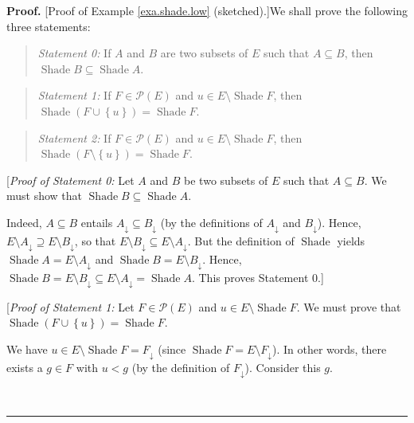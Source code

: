 \documentclass[numbers=enddot,12pt,final,onecolumn]{scrartcl}%
\theoremstyle{definition}
\newenvironment{statement}{\begin{quote}}{\end{quote}}
\newenvironment{proof}[1][Proof]{\noindent\textbf{#1.} }{\ \rule{0.5em}{0.5em}}
\newenvironment{verlong}{}{}
\begin{document}
\begin{verlong}
\begin{proof}
[Proof of Example \ref{exa.shade.low} (sketched).]We shall prove the following
three statements:

\begin{statement}
\textit{Statement 0:} If $A$ and $B$ are two subsets of $E$ such that
$A\subseteq B$, then $\operatorname*{Shade}B\subseteq\operatorname*{Shade}A$.
\end{statement}

\begin{statement}
\textit{Statement 1:} If $F\in\mathcal{P}\left(  E\right)  $ and $u\in
E\setminus\operatorname*{Shade}F$, then $\operatorname*{Shade}\left(
F\cup\left\{  u\right\}  \right)  =\operatorname*{Shade}F$.
\end{statement}

\begin{statement}
\textit{Statement 2:} If $F\in\mathcal{P}\left(  E\right)  $ and $u\in
E\setminus\operatorname*{Shade}F$, then $\operatorname*{Shade}\left(
F\setminus\left\{  u\right\}  \right)  =\operatorname*{Shade}F$.
\end{statement}

[\textit{Proof of Statement 0:} Let $A$ and $B$ be two subsets of $E$ such
that $A\subseteq B$. We must show that $\operatorname*{Shade}B\subseteq
\operatorname*{Shade}A$.

Indeed, $A\subseteq B$ entails $A_{\downarrow}\subseteq B_{\downarrow}$ (by
the definitions of $A_{\downarrow}$ and $B_{\downarrow}$). Hence, $E\setminus
A_{\downarrow}\supseteq E\setminus B_{\downarrow}$, so that $E\setminus
B_{\downarrow}\subseteq E\setminus A_{\downarrow}$. But the definition of
$\operatorname*{Shade}$ yields $\operatorname*{Shade}A=E\setminus
A_{\downarrow}$ and $\operatorname*{Shade}B=E\setminus B_{\downarrow}$. Hence,
$\operatorname*{Shade}B=E\setminus B_{\downarrow}\subseteq E\setminus
A_{\downarrow}=\operatorname*{Shade}A$. This proves Statement 0.]

[\textit{Proof of Statement 1:} Let $F\in\mathcal{P}\left(  E\right)  $ and
$u\in E\setminus\operatorname*{Shade}F$. We must prove that
$\operatorname*{Shade}\left(  F\cup\left\{  u\right\}  \right)
=\operatorname*{Shade}F$.

We have $u\in E\setminus\operatorname*{Shade}F=F_{\downarrow}$ (since
$\operatorname*{Shade}F=E\setminus F_{\downarrow}$). In other words, there
exists a $g\in F$ with $u<g$ (by the definition of $F_{\downarrow}$). Consider
this $g$.


\end{proof}
\end{verlong}
\end{document}
